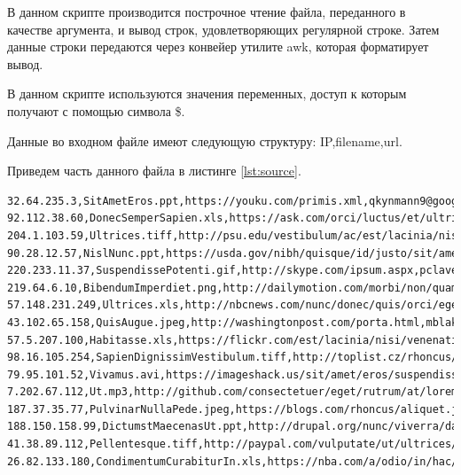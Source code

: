 \documentclass[a4paper,14pt]{extarticle}
\begin{document}
В данном скрипте производится построчное чтение файла, переданного в качестве аргумента, и вывод строк, удовлетворяющих регулярной строке. Затем данные строки передаются через конвейер утилите awk, которая форматирует вывод. 

В данном скрипте используются значения переменных, доступ к которым получают с помощью символа \$. 

Данные во входном файле имеют следующую структуру: IP,filename,url.

Приведем часть данного файла в листинге \ref{lst:source}.

\begin{lstlisting}[caption={Содержание входного файла}, label={lst:soruce}]
32.64.235.3,SitAmetEros.ppt,https://youku.com/primis.xml,qkynmann9@google.cn
92.112.38.60,DonecSemperSapien.xls,https://ask.com/orci/luctus/et/ultrices.html,dmickleburghna@google.com
204.1.103.59,Ultrices.tiff,http://psu.edu/vestibulum/ac/est/lacinia/nisi/venenatis/tristique.jsp,rlarkkemnb@twitpic.com
90.28.12.57,NislNunc.ppt,https://usda.gov/nibh/quisque/id/justo/sit/amet.jpg,mtattersdillnc@amazonaws.com
220.233.11.37,SuspendissePotenti.gif,http://skype.com/ipsum.aspx,pclaveynd@phpbb.com
219.64.6.10,BibendumImperdiet.png,http://dailymotion.com/morbi/non/quam.jpg,vpietaschne@senate.gov
57.148.231.249,Ultrices.xls,http://nbcnews.com/nunc/donec/quis/orci/eget/orci/vehicula.png,hcarluccinf@nymag.com
43.102.65.158,QuisAugue.jpeg,http://washingtonpost.com/porta.html,mblakemoreng@mapquest.com
57.5.207.100,Habitasse.xls,https://flickr.com/est/lacinia/nisi/venenatis/tristique/fusce.xml,mconrenh@last.fm
98.16.105.254,SapienDignissimVestibulum.tiff,http://toplist.cz/rhoncus/dui.xml,areynerni@omniture.com
79.95.101.52,Vivamus.avi,https://imageshack.us/sit/amet/eros/suspendisse.jsp,kzimeknj@vk.com
7.202.67.112,Ut.mp3,http://github.com/consectetuer/eget/rutrum/at/lorem/integer.aspx,dhumbertnk@flickr.com
187.37.35.77,PulvinarNullaPede.jpeg,https://blogs.com/rhoncus/aliquet.js,rblamphinnl@51.la
188.150.158.99,DictumstMaecenasUt.ppt,http://drupal.org/nunc/viverra/dapibus.json,ppurshousenm@fastcompany.com
41.38.89.112,Pellentesque.tiff,http://paypal.com/vulputate/ut/ultrices/vel/augue.json,estanistreetnn@nymag.com
26.82.133.180,CondimentumCurabiturIn.xls,https://nba.com/a/odio/in/hac/habitasse/platea/dictumst.json,ehalwillno@youtube.com


\end{lstlisting}
\end{document}
